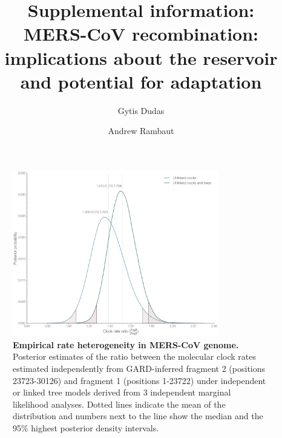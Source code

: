 \documentclass[11pt,oneside,letterpaper]{article}
\begin{document}
\title{\vspace{1.0cm} \huge \bf Supplemental information:\\ \LARGE MERS-CoV recombination: implications about the reservoir and potential for adaptation}

\author[1]{Gytis Dudas}
\author[1,2,3]{Andrew Rambaut}



\maketitle

\setcounter{figure}{0}
\setcounter{table}{0}
\renewcommand{\thefigure}{S\arabic{figure}}
\renewcommand{\thetable}{S\arabic{table}}


\begin{figure}[h]
	\centering	
	\includegraphics[width=0.8\textwidth]{figures/supp_MERS_empiricalHeterogeneity.png}
	\caption{\textbf{Empirical rate heterogeneity in MERS-CoV genome.}
Posterior estimates of the ratio between the molecular clock rates estimated independently from GARD-inferred fragment 2 (positions 23723-30126) and fragment 1 (positions 1-23722) under independent or linked tree models derived from 3 independent marginal likelihood analyses.
Dotted lines indicate the mean of the distribution and numbers next to the line show the median and the 95\% highest posterior density intervals.}
	\label{rateHet}
\end{figure}
\end{document}

